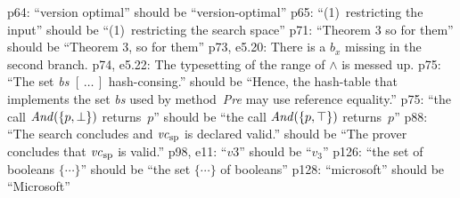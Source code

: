 \e p64: ``version optimal'' should be ``version-optimal''
\e p65: ``(1)~restricting the input'' should be ``(1)~restricting the
  search space''
\e p71: ``Theorem 3 so for them'' should be ``Theorem 3, so for them''
\e p73, e5.20: There is a $b_x$ missing in the second branch.
\e p74, e5.22: The typesetting of the range of $\land$ is messed up.
\e p75: ``The set {\it bs\/} $[\,\ldots\,]$ hash-consing.'' should be ``Hence, the
  hash-table that implements the set {\it bs\/} used by method~{\it Pre} may
  use reference equality.''
\e p75: ``the call ${\it And}(\{p,\bot\})$ returns~$p$'' should be
  ``the call ${\it And}(\{p,\top\})$ returns~$p$''
\e p88: ``The search concludes and ${\it vc}_{\rm sp}$ is declared valid.''
  should be ``The prover concludes that ${\it vc}_{\rm sp}$ is valid.''
\e p98, e11: ``$v3$'' should be ``$v_3$''
\e p126: ``the set of booleans $\{\cdots\}$'' should be ``the set $\{\cdots\}$
  of booleans''
\e p128: ``microsoft'' should be ``Microsoft''

\bye
